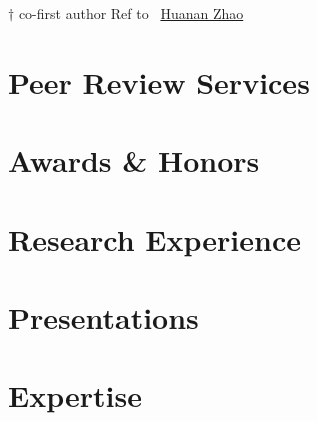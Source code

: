 \documentclass[11pt]{article} %
\begin{document}
$\dagger$ co-first author \hfill  Ref to \scholarsocialsymbol ~\href{https://scholar.google.com/citations?user=ojSVoWQAAAAJ&hl}{Huanan Zhao}





% 

\nocite{*} %
\printbibliography[
    type=article, %
    heading=none, %
    resetnumbers=true, %
]

\section*{Peer Review Services}


\section*{Awards \& Honors}
\label{awards}


\section*{Research Experience}
\label{exp_research}


\section*{Presentations}
\label{presentations}




\section*{Expertise}
\label{expertise}



% 
\end{document}
